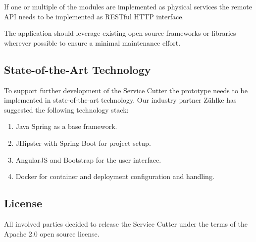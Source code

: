 If one or multiple of the modules are implemented as physical services the remote \gls{API} needs to be implemented as RESTful HTTP interface. 

The application should leverage existing open source frameworks or libraries wherever possible to ensure a minimal maintenance effort.

\subsection{State-of-the-Art Technology}

To support further development of the Service Cutter the prototype needs to be implemented in state-of-the-art technology. Our industry partner Z\"uhlke has suggested the following technology stack:

\begin{enumerate}
	\item Java Spring\cite{spring} as a base framework. 
	\item JHipster\cite{jhipster} with Spring Boot\cite{springboot} for project setup.
	\item AngularJS\cite{angularjs} and Bootstrap\cite{bootstrap} for the user interface.
	\item Docker\cite{docker} for container and deployment configuration and handling. 
\end{enumerate}

\subsection{License}

All involved parties decided to release the Service Cutter under the terms of the Apache 2.0 open source license.